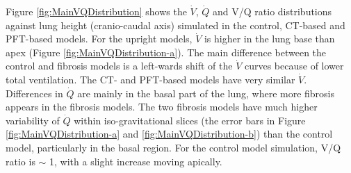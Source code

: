 Figure \ref{fig:MainVQDistribution} shows the $\dot{V}$, $\dot{Q}$ and V/Q ratio distributions against lung height (cranio-caudal axis) simulated in the control, CT-based and PFT-based models. For the upright models, $\dot{V}$ is higher in the lung base than apex (Figure \ref{fig:MainVQDistribution-a}). The main difference between the control and fibrosis models is a left-wards shift of the $\dot{V}$ curves because of lower total ventilation. The CT- and PFT-based models have very similar $\dot{V}$. Differences in $\dot{Q}$ are mainly in the basal part of the lung, where more fibrosis appears in the fibrosis models. The two fibrosis models have much higher variability of $\dot{Q}$ within iso-gravitational slices (the error bars in Figure \ref{fig:MainVQDistribution-a} and \ref{fig:MainVQDistribution-b}) than the control model, particularly in the basal region. For the control model simulation, V/Q ratio is $\sim$ 1, with a slight increase moving apically.

